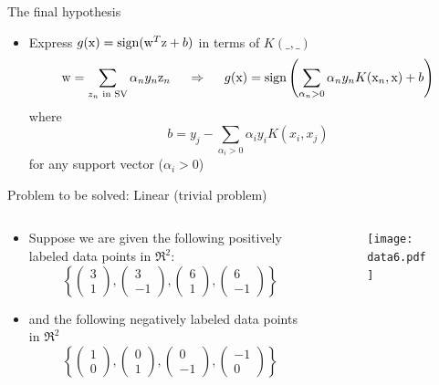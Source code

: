 \begin{frame}{The final hypothesis}
\begin{itemize}
\item Express $g({\rm x})=\text{sign}({\rm w}^T{\rm z}+b)$ in terms of $K(\_,\_)$
\[{\rm w} = \sum\limits_{{z_n}\text{ in SV}} {{\alpha _n}{y_n}{{\rm z}_n} ~~~~\Rightarrow~~~~ g({\rm x}) = \text{sign}\left( {\sum\limits_{{\alpha _n} > 0} {{\alpha _n}{y_n}K({{\rm x}_n},{\rm x})}  + b} \right)} \]
where 
\[b = {y_j} - \sum\limits_{{\alpha _i} > 0} {{\alpha _i}{y_i}K({x_i},{x_j})} \]
for any support vector ($\alpha_i>0$)
\end{itemize}
\end{frame}


\begin{frame}{Problem to be solved: Linear (trivial problem)}
\begin{columns}
\begin{column}{7cm}
\begin{itemize}
\item Suppose we are given the following positively labeled data points in $\Re^2$:
\[\left\{ {\left( {\begin{array}{*{20}{c}}
  3 \\ 
  1 
\end{array}} \right),\left( {\begin{array}{*{20}{c}}
  3 \\ 
  { - 1} 
\end{array}} \right),\left( {\begin{array}{*{20}{c}}
  6 \\ 
  1 
\end{array}} \right),\left( {\begin{array}{*{20}{c}}
  6 \\ 
  { - 1} 
\end{array}} \right)} \right\}\]
\item and the following negatively labeled data points in $\Re^2$
\[\left\{ {\left( {\begin{array}{*{20}{c}}
  1 \\ 
  0 
\end{array}} \right),\left( {\begin{array}{*{20}{c}}
  0 \\ 
  { 1} 
\end{array}} \right),\left( {\begin{array}{*{20}{c}}
  0 \\ 
  -1 
\end{array}} \right),\left( {\begin{array}{*{20}{c}}
  -1 \\ 
  { 0} 
\end{array}} \right)} \right\}\]
\end{itemize}
\end{column}
\begin{column}{7cm}
\begin{figure}
\texttt{[image: data6.pdf]}
\end{figure}
\end{column}
\end{columns}
\end{frame}


